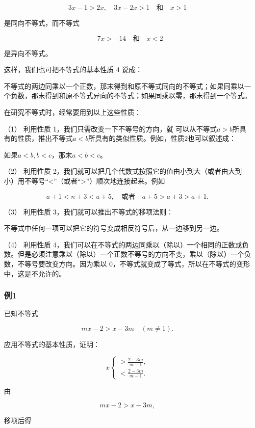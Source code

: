 \[
3 x - 1 > 2 x, \quad 3 x - 2 x > 1 \quad \text{和} \quad x > 1
\]

是同向不等式，而不等式

\[
- 7 x > - 14 \quad \text{和} \quad x < 2
\]

是异向不等式。

这样，我们也可把不等式的基本性质 4 说成：

不等式的两边同乘以一个正数，那末得到和原不等式同向的不等式；如果同乘以一个负数，那末得到和原不等式异向的不等式；如果同乘以零，那末得到一个等式。

在研究不等式时，经常要用到以上这些性质：

（1） 利用性质 1，我们只需改变一下不等号的方向，就
可以从不等式\(a > b\)所具有的性质，推出不等式\(a < b\)所具有的类似性质。例如，性质2也可以叙述成：

如果\(a < b, b < c\)，那末\(a < b < c\)。

（2） 利用性质
2，我们就可以把几个代数式按照它的值由小到大（或者由大到小）用不等号``\textless''（或者``\textgreater''）顺次地连接起来。例如

\[
a + 1 < n + 3 < a + 5, \quad \text{或者} \quad a + 5 > a + 3 > a + 1.
\]

（3） 利用性质 3，我们就可以推出不等式的移项法则：

不等式中任何一项可以把它的符号变成相反符号后，从一边移到另一边。

（4） 利用性质
4，我们可以在不等式的两边同乘以（除以）一个相同的正数或负数。但是必须注意乘以（除以）一个正数不等号的方向不变，乘以（除以）一个负数，不等号要改变方向。因为乘以
0，不等式就变成了等式，所以在不等式的变形中，这是不允许的。

\subsubsection{例1}

已知不等式

\[
m x - 2 > x - 3 m \quad (m \neq 1).
\]

应用不等式的基本性质，证明：

\[
x \left\{ \begin{array}{l} > \frac{2 - 3 m}{m - 1}, \\ < \frac{2 - 3 m}{m - 1}. \end{array} \right.
\]

 由

\[
m x - 2 > x - 3 m, \tag {1}
\]

移项后得

